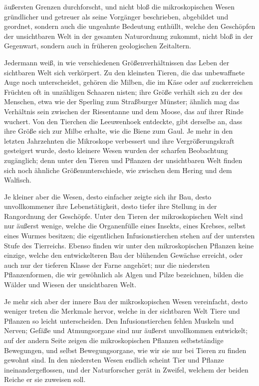\documentclass[a4paper, 11pt, oneside, english]{article}
\begin{document}
äußersten Grenzen durchforscht, und nicht bloß die mikroskopischen Wesen gründlicher und getreuer als seine Vorgänger beschrieben, abgebildet und geordnet, sondern auch die ungeahnte Bedeutung enthüllt, welche den Geschöpfen der unsichtbaren Welt in der gesamten Naturordnung zukommt, nicht bloß in der Gegenwart, sondern auch in früheren geologischen Zeitaltern.

Jedermann weiß, in wie verschiedenen Größenverhältnissen das Leben der sichtbaren Welt sich verkörpert. Zu den kleinsten Tieren, die das unbewaffnete Auge noch unterscheidet, gehören die Milben, die im Käse oder auf zuckerreichen Früchten oft in unzähligen Schaaren nisten; ihre Größe verhält sich zu der des Menschen, etwa wie der Sperling zum Straßburger Münster; ähnlich mag das Verhältnis sein zwischen der Riesentanne und dem Moose, das auf ihrer Rinde wuchert. Von den Tierchen die Leeuwenhoek entdeckte, gibt derselbe an, dass ihre Größe sich zur Milbe erhalte, wie die Biene zum Gaul. Je mehr in den letzten Jahrzehnten die Mikroskope verbessert und ihre Vergrößerungskraft gesteigert wurde, desto kleinere Wesen wurden der scharfen Beobachtung zugänglich; denn unter den Tieren und Pflanzen der unsichtbaren Welt finden sich noch ähnliche Größenunterschiede, wie zwischen dem Hering und dem Walfisch.

Je kleiner aber die Wesen, desto einfacher zeigte sich ihr Bau, desto unvollkommener ihre Lebenstätigkeit, desto tiefer ihre Stellung in der Rangordnung der Geschöpfe. Unter den Tieren der mikroskopischen Welt sind nur äußerst wenige, welche die Organenfülle eines Insekts, eines Krebses, selbst eines Wurmes besitzen; die eigentlichen Infusionstierchen stehen auf der untersten Stufe des Tierreichs. Ebenso finden wir unter den mikroskopischen Pflanzen keine einzige, welche den entwickelteren Bau der blühenden Gewächse erreicht, oder auch nur der tieferen Klasse der Farne angehört; nur die niedersten Pflanzenformen, die wir gewöhnlich als Algen und Pilze bezeichnen, bilden die Wälder und Wiesen der unsichtbaren Welt.

Je mehr sich aber der innere Bau der mikroskopischen Wesen vereinfacht, desto weniger treten die Merkmale hervor, welche in der sichtbaren Welt Tiere und Pflanzen so leicht unterscheiden. Den Infusionstierchen fehlen Muskeln und Nerven; Gefäße und Atmungsorgane sind nur äußerst unvollkommen entwickelt; auf der andern Seite zeigen die mikroskopischen Pflanzen selbstständige Bewegungen, und selbst Bewegungsorgane, wie wir sie nur bei Tieren zu finden gewohnt sind. In den niedersten Wesen endlich scheint Tier und Pflanze ineinandergeflossen, und der Naturforscher gerät in Zweifel, welchem der beiden Reiche er sie zuweisen soll.
\end{document}
